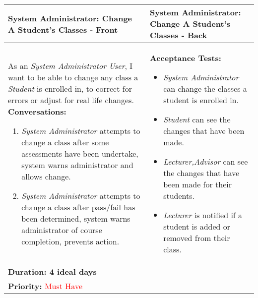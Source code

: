 \documentclass[11pt]{article}
\begin{document}
\begin{center}
\begin{tabular}{ | m{8cm}  |  m{8cm}  | } 
 \hline
 \textbf{System Administrator: Change A Student's Classes - Front} &  \textbf{System Administrator: Change A Student's Classes - Back}  \\ 
  \hline
As an \emph{System Administrator User}, I want to be able to change any class a \emph{Student} is enrolled in, to correct for errors or adjust for real life changes.  \newline
\textbf{Conversations:}
\begin{enumerate}
\item{\emph{System Administrator} attempts to change a class after some assessments have been undertake, system warns administrator and allows change.}
\item{\emph{System Administrator} attempts to change a class after pass/fail has been determined, system warns administrator of course completion, prevents action.}
\end{enumerate}
& \textbf{Acceptance Tests:} 
\begin{itemize}
\item{\emph{System Administrator} can change the classes a student is enrolled in.}
\item{\emph{Student} can see the changes that have been made.}
\item{\emph{Lecturer,Advisor} can see the changes that have been made for their students.}
\item{\emph{Lecturer} is notified if a student is added or removed from their class.}
\end{itemize} \\
\textbf{Duration: 4 ideal days} &\\
\textbf{Priority:}  \textcolor{red}{Must Have} & \\
 \hline
\end{tabular}
\end{center}
\end{document}
